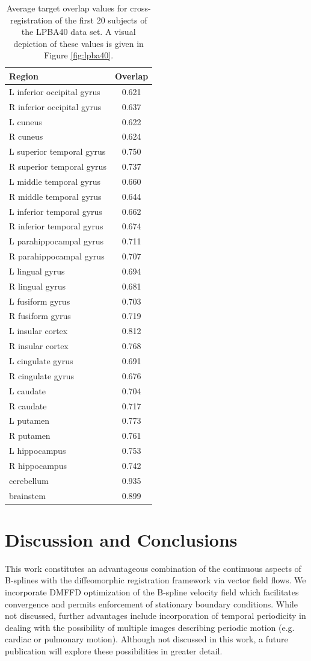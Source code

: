 \documentclass{llncs}
\begin{document}
\begin{table}[ht]
\begin{minipage}[b]{0.5\linewidth}
\begin{tabular}{lc}
{\bf Region} & {\bf Overlap} \\
\hline
L inferior occipital gyrus & 0.621 \\
R inferior occipital gyrus & 0.637 \\
L cuneus & 0.622 \\
R cuneus & 0.624 \\
L superior temporal gyrus & 0.750 \\
R superior temporal gyrus & 0.737 \\
L middle temporal gyrus & 0.660 \\
R middle temporal gyrus & 0.644 \\
L inferior temporal gyrus & 0.662 \\
R inferior temporal gyrus & 0.674 \\
L parahippocampal gyrus & 0.711 \\
R parahippocampal gyrus & 0.707 \\
L lingual gyrus & 0.694 \\
R lingual gyrus & 0.681 \\
L fusiform gyrus & 0.703 \\
R fusiform gyrus & 0.719 \\
L insular cortex & 0.812 \\
R insular cortex & 0.768 \\
L cingulate gyrus & 0.691 \\
R cingulate gyrus & 0.676 \\
L caudate & 0.704 \\
R caudate & 0.717 \\
L putamen & 0.773 \\
R putamen & 0.761 \\
L hippocampus & 0.753 \\
R hippocampus & 0.742 \\
cerebellum & 0.935 \\
brainstem & 0.899 \\
\hline
\end{tabular}
\end{minipage}
\vspace{1.0mm}
\caption{Average target overlap values for cross-registration of the first 
20 subjects of the LPBA40 data set.  A visual depiction of these values is
given in Figure \ref{fig:lpba40}.
}
\end{table}

\section{Discussion and Conclusions}
This work constitutes an advantageous combination of the continuous aspects of
B-splines with the diffeomorphic registration framework via vector field 
flows.  We incorporate
DMFFD optimization of the B-spline velocity field which facilitates 
convergence and permits enforcement of stationary boundary conditions.  
While not discussed, further advantages include incorporation of temporal 
periodicity in dealing with the possibility of multiple images describing
periodic motion (e.g. cardiac or pulmonary motion).  Although not discussed
in this work, a future publication will explore these possibilities in 
greater detail. 



\end{document}
